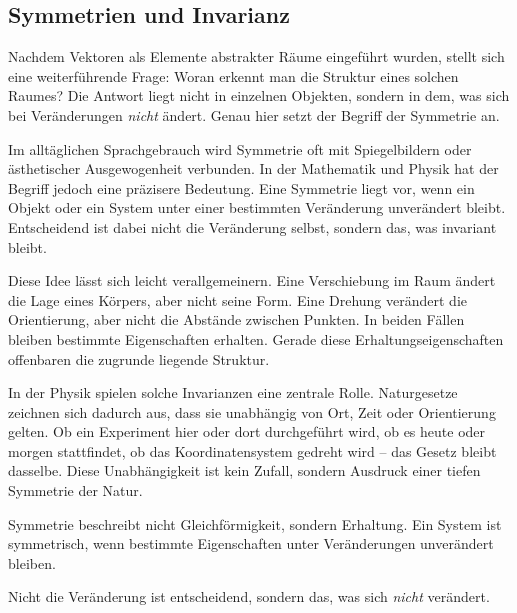 \subsection{Symmetrien und Invarianz}

Nachdem Vektoren
als Elemente abstrakter Räume eingeführt wurden,
stellt sich eine weiterführende Frage:
Woran erkennt man die Struktur eines solchen Raumes?
Die Antwort liegt nicht in einzelnen Objekten,
sondern in dem,
was sich bei Veränderungen \emph{nicht} ändert.
Genau hier setzt der Begriff der Symmetrie an.

Im alltäglichen Sprachgebrauch
wird Symmetrie oft mit Spiegelbildern
oder ästhetischer Ausgewogenheit verbunden.
In der Mathematik
und Physik
hat der Begriff jedoch eine präzisere Bedeutung.
Eine Symmetrie liegt vor,
wenn ein Objekt oder ein System
unter einer bestimmten Veränderung unverändert bleibt.
Entscheidend ist dabei nicht die Veränderung selbst,
sondern das,
was invariant bleibt.

Diese Idee lässt sich leicht verallgemeinern.
Eine Verschiebung im Raum
ändert die Lage eines Körpers,
aber nicht seine Form.
Eine Drehung
verändert die Orientierung,
aber nicht die Abstände zwischen Punkten.
In beiden Fällen bleiben bestimmte Eigenschaften erhalten.
Gerade diese Erhaltungseigenschaften
offenbaren die zugrunde liegende Struktur.

In der Physik spielen solche Invarianzen eine zentrale Rolle.
Naturgesetze
zeichnen sich dadurch aus,
dass sie unabhängig von Ort,
Zeit
oder Orientierung gelten.
Ob ein Experiment hier oder dort durchgeführt wird,
ob es heute oder morgen stattfindet,
ob das Koordinatensystem gedreht wird --
das Gesetz bleibt dasselbe.
Diese Unabhängigkeit ist kein Zufall,
sondern Ausdruck einer tiefen Symmetrie der Natur.

\begin{DidacticBox}
	\label{box:symmetrie}
	Symmetrie beschreibt nicht Gleichförmigkeit,
	sondern Erhaltung.
	Ein System ist symmetrisch,
	wenn bestimmte Eigenschaften unter Veränderungen unverändert bleiben.
	
	Nicht die Veränderung ist entscheidend,
	sondern das,
	was sich \emph{nicht} verändert.
\end{DidacticBox}

